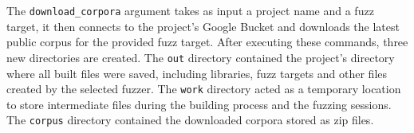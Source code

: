\newline \newline
The \verb|download_corpora| argument takes as input a project name and a fuzz target, it then connects to the project's Google Bucket and downloads the latest public corpus for the provided fuzz target.
\newline \newline \newline
After executing these commands, three new directories are created.
\newline
The \verb|out| directory contained the project's directory where all built files were saved, including libraries, fuzz targets and other files created by the selected fuzzer.
\newline
The \verb|work| directory acted as a temporary location to store intermediate files during the building process and the fuzzing sessions.
\newline
The \verb|corpus| directory contained the downloaded corpora stored as zip files.



